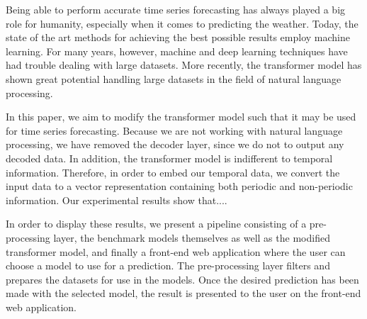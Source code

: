 Being able to perform accurate time series forecasting has always played a big role for humanity, especially when it comes to predicting the weather. 
Today, the state of the art methods for achieving the best possible results employ machine learning. 
For many years, however, machine and deep learning techniques have had trouble dealing with large datasets. 
More recently, the transformer model has shown great potential handling large datasets in the field of natural language processing.

In this paper, we aim to modify the transformer model such that it may be used for time series forecasting. 
Because we are not working with natural language processing, we have removed the decoder layer, since we do not to output any decoded data. 
In addition, the transformer model is indifferent to temporal information. 
Therefore, in order to embed our temporal data, we convert the input data to a vector representation containing both periodic and non-periodic information.
Our experimental results show that.... 

In order to display these results, we present a pipeline consisting of a pre-processing layer, the benchmark models themselves as well as the modified transformer model, and finally a front-end web application where the user can choose a model to use for a prediction.
The pre-processing layer filters and prepares the datasets for use in the models.
Once the desired prediction has been made with the selected model, the result is presented to the user on the front-end web application.